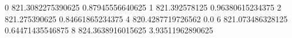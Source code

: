 0 821.3082275390625 0.87945556640625
1 821.392578125 0.96380615234375
2 821.275390625 0.84661865234375
4 820.4287719726562 0.0
6 821.073486328125 0.64471435546875
8 824.3638916015625 3.93511962890625
